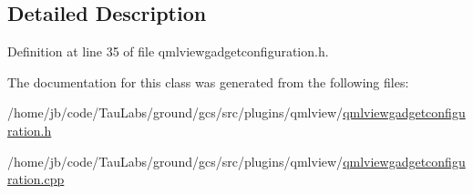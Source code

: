 \subsection{\-Detailed \-Description}


\-Definition at line 35 of file qmlviewgadgetconfiguration.\-h.



\-The documentation for this class was generated from the following files\-:\begin{DoxyCompactItemize}
\item 
/home/jb/code/\-Tau\-Labs/ground/gcs/src/plugins/qmlview/\hyperlink{qmlviewgadgetconfiguration_8h}{qmlviewgadgetconfiguration.\-h}\item 
/home/jb/code/\-Tau\-Labs/ground/gcs/src/plugins/qmlview/\hyperlink{qmlviewgadgetconfiguration_8cpp}{qmlviewgadgetconfiguration.\-cpp}\end{DoxyCompactItemize}
